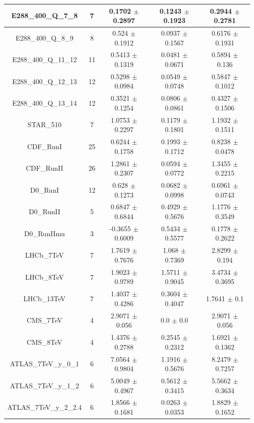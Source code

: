 \documentclass[
]{article}
\begin{document}
\begin{table}[h]
\begin{tabular}{|c|c|c|c|c|}
E288\_400\_Q\_7\_8 & 7 & 0.1702 \(\pm\) 0.2897 & 0.1243 \(\pm\)
0.1923 & 0.2944 \(\pm\) 0.2781 \\ \hline
E288\_400\_Q\_8\_9 & 8 & 0.524 \(\pm\) 0.1912 & 0.0937 \(\pm\)
0.1567 & 0.6176 \(\pm\) 0.1931 \\ \hline
E288\_400\_Q\_11\_12 & 11 & 0.5413 \(\pm\) 0.1319 & 0.0481 \(\pm\)
0.0671 & 0.5894 \(\pm\) 0.136 \\ \hline
E288\_400\_Q\_12\_13 & 12 & 0.5298 \(\pm\) 0.0984 & 0.0549 \(\pm\)
0.0748 & 0.5847 \(\pm\) 0.1012 \\ \hline
E288\_400\_Q\_13\_14 & 12 & 0.3521 \(\pm\) 0.1254 & 0.0806 \(\pm\)
0.0861 & 0.4327 \(\pm\) 0.1506 \\ \hline
STAR\_510 & 7 & 1.0753 \(\pm\) 0.2297 & 0.1179 \(\pm\) 0.1801 & 1.1932
\(\pm\) 0.1511 \\ \hline
CDF\_RunI & 25 & 0.6244 \(\pm\) 0.1758 & 0.1993 \(\pm\) 0.1712 & 0.8238
\(\pm\) 0.0478 \\ \hline
CDF\_RunII & 26 & 1.2861 \(\pm\) 0.2307 & 0.0594 \(\pm\) 0.0772 & 1.3455
\(\pm\) 0.2215 \\ \hline
D0\_RunI & 12 & 0.628 \(\pm\) 0.1273 & 0.0682 \(\pm\) 0.0998 & 0.6961
\(\pm\) 0.0743 \\ \hline
D0\_RunII & 5 & 0.6847 \(\pm\) 0.6844 & 0.4929 \(\pm\) 0.5676 & 1.1776
\(\pm\) 0.3549 \\ \hline
D0\_RunIImu & 3 & -0.3655 \(\pm\) 0.6009 & 0.5434 \(\pm\)
0.5577 & 0.1778 \(\pm\) 0.2622 \\ \hline
LHCb\_7TeV & 7 & 1.7619 \(\pm\) 0.7676 & 1.068 \(\pm\) 0.7369 & 2.8299
\(\pm\) 0.194 \\ \hline
LHCb\_8TeV & 7 & 1.9023 \(\pm\) 0.9789 & 1.5711 \(\pm\) 0.9045 & 3.4734
\(\pm\) 0.3695 \\ \hline
LHCb\_13TeV & 7 & 1.4037 \(\pm\) 0.4286 & 0.3604 \(\pm\) 0.4047 & 1.7641
\(\pm\) 0.1 \\ \hline
CMS\_7TeV & 4 & 2.9071 \(\pm\) 0.056 & 0.0 \(\pm\) 0.0 & 2.9071 \(\pm\)
0.056 \\ \hline
CMS\_8TeV & 4 & 1.4376 \(\pm\) 0.2788 & 0.2545 \(\pm\) 0.2312 & 1.6921
\(\pm\) 0.1362 \\ \hline
ATLAS\_7TeV\_y\_0\_1 & 6 & 7.0564 \(\pm\) 0.9804 & 1.1916 \(\pm\)
0.5676 & 8.2479 \(\pm\) 0.7257 \\ \hline
ATLAS\_7TeV\_y\_1\_2 & 6 & 5.0049 \(\pm\) 0.4967 & 0.5612 \(\pm\)
0.3415 & 5.5662 \(\pm\) 0.3634 \\ \hline
ATLAS\_7TeV\_y\_2\_2.4 & 6 & 1.8566 \(\pm\) 0.1681 & 0.0263 \(\pm\)
0.0353 & 1.8829 \(\pm\) 0.1652 \\ \hline

\end{tabular}
\end{table}
\end{document}

